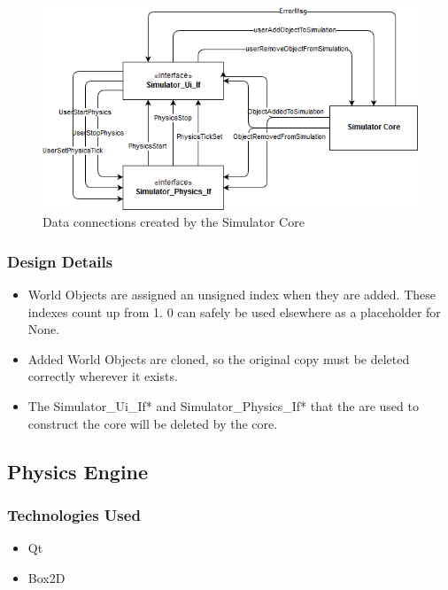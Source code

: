  \begin{figure}[h]
 	\begin{center}
 	\includegraphics[scale=0.5]{./images_design/uml/DataFlow_simcore}
 	\caption{Data connections created by the Simulator Core\label{uml:dataflow_simcore}}
 	\end{center}
 \end{figure} 

\subsubsection*{Design Details}
\begin{itemize}
	\item World Objects are assigned an unsigned index when they are added. These indexes count up from 1. 0 can safely be used elsewhere as a placeholder for None.
	\item Added World Objects are cloned, so the original copy must be deleted correctly wherever it exists.
	\item The Simulator\_Ui\_If* and Simulator\_Physics\_If* that the are used to construct the core will be deleted by the core.
\end{itemize}

\subsection{Physics Engine}

\subsubsection*{Technologies  Used}
\begin{itemize}
	\item Qt
	\item Box2D
\end{itemize}

